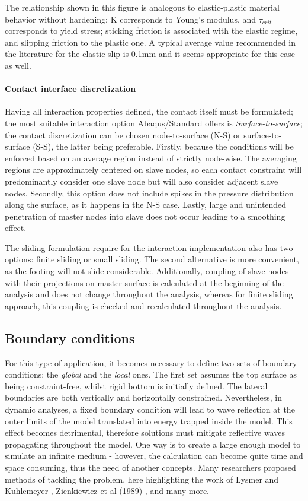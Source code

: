 The relationship shown in this figure is analogous to elastic-plastic material behavior without hardening: K corresponds to Young's modulus, and $\tau_{crit}$ corresponds to yield stress; sticking friction is associated with the elastic regime, and slipping friction to the plastic one. A typical average value recommended in the literature for the elastic slip is 0.1mm and it seems appropriate for this case as well.

\paragraph{Contact interface discretization}
Having all interaction properties defined, the contact itself must be formulated; the most suitable interaction option Abaqus/Standard offers is \textit{Surface-to-surface}; the contact discretization can be chosen node-to-surface (N-S) or surface-to-surface (S-S), the latter being preferable. Firstly, because the conditions will be enforced based on an average region instead of strictly node-wise. The averaging regions are approximately centered on slave nodes, so each contact constraint will predominantly consider one slave node but will also consider adjacent slave nodes. Secondly, this option does not include spikes in the pressure distribution along the surface, as it happens in the N-S case. Lastly, large and unintended penetration of master nodes into slave does not occur leading to a smoothing effect.

The sliding formulation require for the interaction implementation also has two options: finite sliding or small sliding. The second alternative is more convenient, as the footing will not slide considerable. Additionally, coupling of slave nodes with their projections on master surface
is calculated at the beginning of the analysis and does not change throughout the analysis,
whereas for finite sliding approach, this coupling is checked and recalculated throughout the
analysis.

\subsection{Boundary conditions}
For this type of application, it becomes necessary to define two sets of boundary conditions: the \textit{global} and the \textit{local} ones. The first set assumes the top surface as being constraint-free, whilst rigid bottom is initially defined. The lateral boundaries are both vertically and horizontally constrained.
Nevertheless, in dynamic analyses, a fixed boundary condition will lead to wave reflection at the outer limits of the model translated into energy trapped inside the model. This effect becomes detrimental, therefore solutions must mitigate reflective waves propagating throughout the model. One way is to create a large enough model to simulate an infinite medium - however, the calculation can become quite time and space consuming, thus the need of another concepts. Many researchers proposed methods of tackling the problem, here highlighting the work of Lysmer and Kuhlemeyer \cite{zienkiewicz1989earthquake}, Zienkiewicz et al (1989) \cite{zienkiewicz1989earthquake},  and many more.

